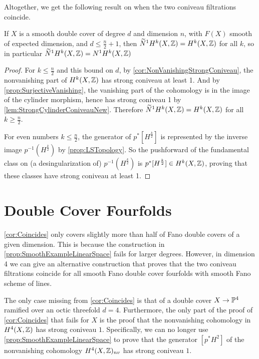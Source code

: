 Altogether, we get the following result on when the two coniveau filtrations coincide.
\begin{theorem}
  \label{cor:Coincides}
    If $X$ is a smooth double cover of degree $d$ and dimension $n$, with $F(X)$ smooth of expected dimension, and $d \leq \frac{n}{2}+1$, then $\widetilde{N}^1H^k(X,\Z) = H^k(X,\Z)$ for all $k$, so in particular $\widetilde{N}^1H^k(X,\Z) = N^1H^k(X,\Z)$
\end{theorem}
\begin{proof}
For $k \leq \frac{n}{2}$ and this bound on $d$, by \cref{cor:NonVanishingStrongConiveau}, the nonvanishing part of $H^k(X,\Z)$ has strong coniveau at least 1. And by \cref{prop:SurjectiveVanishing}, the vanishing part of the cohomology is in the image of the cylinder morphism, hence has strong coniveau 1 by \cref{lem:StrongCylinderConiveauNew}. Therefore $\widetilde{N}^1H^k(X,\Z) = H^k(X,\Z)$ for all $k \geq \frac{n}{2}$.

For even numbers $k \leq \frac{n}{2}$, the generator of $p^*[H^{\frac{k}{2}}]$ is represented by the inverse image $p^{-1}(H^{\frac{k}{2}})$ by \cref{prop:LSTopology}. So the pushforward of the fundamental class on (a desingularization of) $p^{-1}(H^{\frac{k}{2}})$ is $p^*[H^{\frac{k}{2}}] \in H^k(X,\Z)$, proving that these classes have strong coniveau at least 1.
\end{proof}

\section{Double Cover Fourfolds}
\cref{cor:Coincides} only covers slightly more than half of Fano double covers of a given dimension. This is because the construction in \cref{prop:SmoothExampleLinearSpace} fails for larger degrees. However, in dimension 4 we can give an alternative construction that proves that the two coniveau filtrations coincide for all smooth Fano double cover fourfolds with smooth Fano scheme of lines.

The only case missing from \cref{cor:Coincides} is that of a double cover $X \to \P^4$ ramified over an octic threefold \ie $d=4$. Furthermore, the only part of the proof of \cref{cor:Coincides} that fails for $X$ is the proof that the nonvanishing cohomology in $H^4(X,\Z)$ has strong coniveau $1$. Specifically, we can no longer use \cref{prop:SmoothExampleLinearSpace} to prove that the generator $[p^*H^2]$ of the nonvanishing cohomology $H^4(X,\Z)_{nv}$ has strong coniveau $1$.

